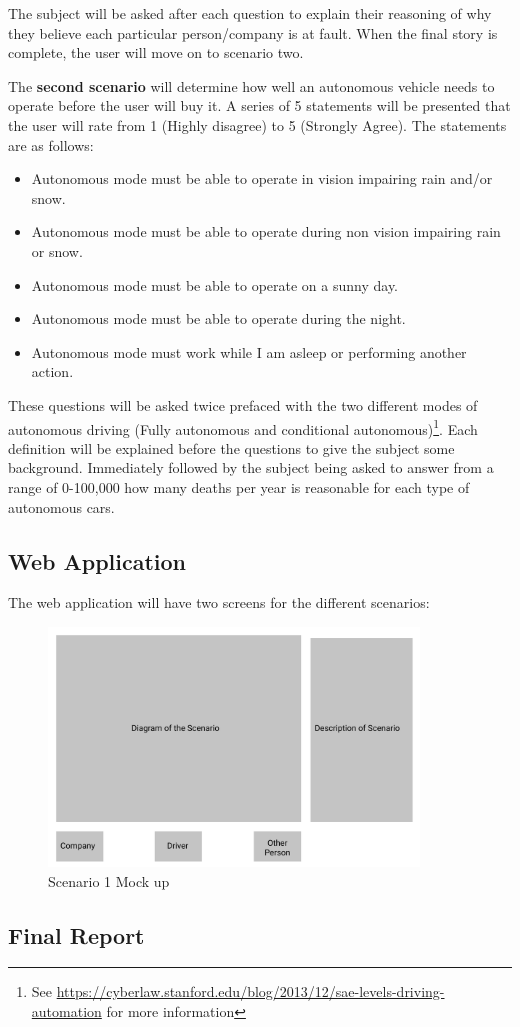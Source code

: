 \documentclass{article}
\begin{document}
The subject will be asked after each question to explain their reasoning of why
they believe each particular person/company is at fault. When the final story is
complete, the user will move on to scenario two.

The \textbf{second scenario} will determine how well an autonomous vehicle needs
to operate before the user will buy it. A series of 5 statements will be
presented that the user will rate from 1 (Highly disagree) to 5 (Strongly
Agree). The statements are as follows:
\begin{itemize}
  \item Autonomous mode must be able to operate in vision impairing rain and/or
    snow.
  \item Autonomous mode must be able to operate during non vision impairing rain
    or snow.
  \item Autonomous mode must be able to operate on a sunny day.
  \item Autonomous mode must be able to operate during the night.
  \item Autonomous mode must work while I am asleep or performing another action.
\end{itemize}

These questions will be asked twice prefaced with the two different modes of
autonomous driving (Fully autonomous and conditional autonomous)\footnote{See
\url{https://cyberlaw.stanford.edu/blog/2013/12/sae-levels-driving-automation}
for more information}. Each definition will be explained before the questions to
give the subject some background. Immediately followed by the subject being
asked to answer from a range of 0-100,000 how many deaths per year is reasonable
for each type of autonomous cars.

\subsection{Web Application}
The web application will have two screens for the different scenarios:
\begin{figure}[H]
\centering
\includegraphics[height=2.5in]{imgs/scenario_1.png}
\caption{Scenario 1 Mock up}
\label{fig:ceads-architecture}
\end{figure}


\subsection{Final Report}



\end{document}
